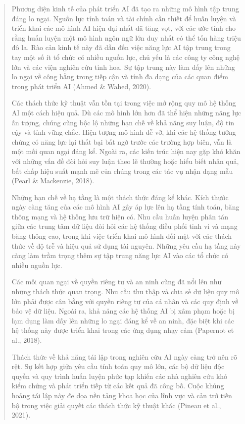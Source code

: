 \begin{quote}
Phương diện kinh tế của phát triển AI đã tạo ra những mô hình tập trung đáng lo ngại. Nguồn lực tính toán và tài chính cần thiết để huấn luyện và triển khai các mô hình AI hiện đại nhất đã tăng vọt, với các ước tính cho rằng huấn luyện một mô hình ngôn ngữ lớn duy nhất có thể tốn hàng triệu đô la. Rào cản kinh tế này đã dẫn đến việc năng lực AI tập trung trong tay một số ít tổ chức có nhiều nguồn lực, chủ yếu là các công ty công nghệ lớn và các viện nghiên cứu tinh hoa. Sự tập trung này làm dấy lên những lo ngại về công bằng trong tiếp cận và tính đa dạng của các quan điểm trong phát triển AI (Ahmed \& Wahed, 2020).

Các thách thức kỹ thuật vẫn tồn tại trong việc mở rộng quy mô hệ thống AI một cách hiệu quả. Dù các mô hình lớn hơn đã thể hiện những năng lực ấn tượng, chúng cũng bộc lộ những hạn chế về khả năng suy luận, độ tin cậy và tính vững chắc. Hiện tượng mô hình dễ vỡ, khi các hệ thống tưởng chừng có năng lực lại thất bại bất ngờ trước các trường hợp biên, vẫn là một mối quan ngại đáng kể. Ngoài ra, các kiến trúc hiện nay gặp khó khăn với những vấn đề đòi hỏi suy luận theo lẽ thường hoặc hiểu biết nhân quả, bất chấp hiệu suất mạnh mẽ của chúng trong các tác vụ nhận dạng mẫu (Pearl \& Mackenzie, 2018).

Những hạn chế về hạ tầng là một thách thức đáng kể khác. Kích thước ngày càng tăng của các mô hình AI gây áp lực lên hạ tầng tính toán, băng thông mạng và hệ thống lưu trữ hiện có. Nhu cầu huấn luyện phân tán giữa các trung tâm dữ liệu đòi hỏi các hệ thống điều phối tinh vi và mạng băng thông cao, trong khi việc triển khai mô hình đối mặt với các thách thức về độ trễ và hiệu quả sử dụng tài nguyên. Những yêu cầu hạ tầng này càng làm trầm trọng thêm sự tập trung năng lực AI vào các tổ chức có nhiều nguồn lực.

Các mối quan ngại về quyền riêng tư và an ninh cũng đã nổi lên như những thách thức quan trọng. Nhu cầu thu thập và chia sẻ dữ liệu quy mô lớn phải được cân bằng với quyền riêng tư của cá nhân và các quy định về bảo vệ dữ liệu. Ngoài ra, khả năng các hệ thống AI bị xâm phạm hoặc bị lạm dụng làm dấy lên những lo ngại đáng kể về an ninh, đặc biệt khi các hệ thống này được triển khai trong các ứng dụng nhạy cảm (Papernot et al., 2018).

Thách thức về khả năng tái lập trong nghiên cứu AI ngày càng trở nên rõ rệt. Sự kết hợp giữa yêu cầu tính toán quy mô lớn, các bộ dữ liệu độc quyền và quy trình huấn luyện phức tạp khiến các nhà nghiên cứu khó kiểm chứng và phát triển tiếp từ các kết quả đã công bố. Cuộc khủng hoảng tái lập này đe dọa nền tảng khoa học của lĩnh vực và cản trở tiến bộ trong việc giải quyết các thách thức kỹ thuật khác (Pineau et al., 2021).


\end{quote}

